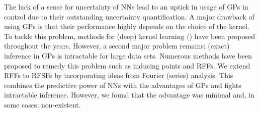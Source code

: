 The lack of a sense for uncertainty of \acp{NN} lead to an uptick in usage of \acp{GP} in control due to their outstanding uncertainty quantification.
A major drawback of using \acp{GP} is that their performance highly depends on the choice of the kernel.
To tackle this problem, methods for (deep) kernel learning () have been proposed throughout the years.
However, a second major problem remains: (exact) inference in \acp{GP} is intractable for large data sets.
Numerous methods have been proposed to remedy this problem such as inducing points and \acp{RFF}.
We extend \acp{RFF} to \acp{RFSF} by incorporating ideas from Fourier (series) analysis.
This combines the predictive power of \acp{NN} with the advantages of \acp{GP} and fights intractable inference.
However, we found that the advantage was minimal and, in some cases, non-existent.
